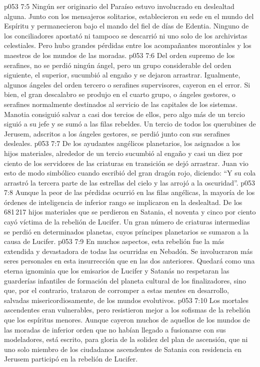 \vs p053 7:5 Ningún ser originario del Paraíso estuvo involucrado en deslealtad alguna. Junto con los mensajeros solitarios, establecieron su sede en el mundo del Espíritu y permanecieron bajo el mando del fiel de días de Edentia. Ninguno de los conciliadores apostató ni tampoco se descarrió ni uno solo de los archivistas celestiales. Pero hubo grandes pérdidas entre los acompañantes morontiales y los maestros de los mundos de las moradas.
\vs p053 7:6 Del orden supremo de los serafines, no se perdió ningún ángel, pero un grupo considerable del orden siguiente, el superior, sucumbió al engaño y se dejaron arrastrar. Igualmente, algunos ángeles del orden tercero o serafines supervisores, cayeron en el error. Si bien, el gran descalabro se produjo en el cuarto grupo, o ángeles gestores, o serafines normalmente destinados al servicio de las capitales de los sistemas. Manotia consiguió salvar a casi dos tercios de ellos, pero algo más de un tercio siguió a su jefe y se sumó a las filas rebeldes. Un tercio de todos los querubines de Jerusem, adscritos a los ángeles gestores, se perdió junto con sus serafines desleales.
\vs p053 7:7 De los ayudantes angélicos planetarios, los asignados a los hijos materiales, alrededor de un tercio sucumbió al engaño y casi un diez por ciento de los servidores de las criaturas en transición se dejó arrastrar. Juan vio esto de modo simbólico cuando escribió del gran dragón rojo, diciendo: “Y su cola arrastró la tercera parte de las estrellas del cielo y las arrojó a la oscuridad”.
\vs p053 7:8 Aunque la peor de las pérdidas ocurrió en las filas angélicas, la mayoría de los órdenes de inteligencia de inferior rango se implicaron en la deslealtad. De los 681\,217 hijos materiales que se perdieron en Satania, el noventa y cinco por ciento cayó víctima de la rebelión de Lucifer. Un gran número de criaturas intermedias se perdió en determinados planetas, cuyos príncipes planetarios se sumaron a la causa de Lucifer.
\vs p053 7:9 \pc En muchos aspectos, esta rebelión fue la más extendida y devastadora de todas las ocurridas en Nebadón. Se involucraron más seres personales en esta insurrección que en las dos anteriores. Quedará como una eterna ignominia que los emisarios de Lucifer y Satanás no respetaran las guarderías infantiles de formación del planeta cultural de los finalizadores, sino que, por el contrario, trataron de corromper a estas mentes en desarrollo, salvadas misericordiosamente, de los mundos evolutivos.
\vs p053 7:10 \pc Los mortales ascendentes eran vulnerables, pero resistieron mejor a los sofismas de la rebelión que los espíritus menores. Aunque cayeron muchos de aquellos de los mundos de las moradas de inferior orden que no habían llegado a fusionarse con sus modeladores, está escrito, para gloria de la solidez del plan de ascensión, que ni uno solo miembro de los ciudadanos ascendentes de Satania con residencia en Jerusem participó en la rebelión de Lucifer.
